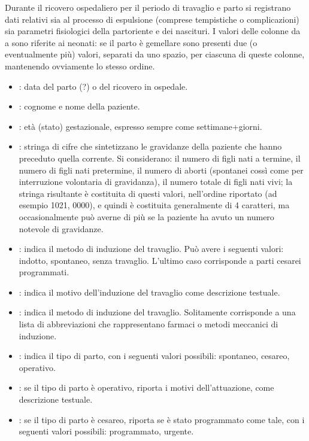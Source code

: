 Durante il ricovero ospedaliero per il periodo di travaglio e parto si registrano dati relativi sia al processo di espulsione (comprese tempistiche o complicazioni) sia parametri fisiologici della partoriente e dei nascituri.
I valori delle colonne da  a  sono riferite ai neonati: se il parto è gemellare sono presenti due (o eventualmente più) valori, separati da uno spazio, per ciascuna di queste colonne, mantenendo ovviamente lo stesso ordine.

\begin{itemize}
\item {}: data del parto (?) o del ricovero in ospedale.
\item {}: cognome e nome della paziente.
\item {}: età (stato) gestazionale, espresso sempre come settimane+giorni.
\item {}: stringa di cifre che sintetizzano le gravidanze della paziente che hanno preceduto quella corrente.
Si considerano: il numero di figli nati a termine, il numero di figli nati pretermine, il numero di aborti (spontanei cossì come per interruzione volontaria di gravidanza), il numero totale di figli nati vivi; la stringa risultante è costituita di questi valori, nell'ordine riportato (ad esempio 1021, 0000), e quindi è costituita generalmente di 4 caratteri, ma occasionalmente può averne di più se la paziente ha avuto un numero notevole di gravidanze.
\item {}: indica il metodo di induzione del travaglio. Può avere i seguenti valori: indotto, spontaneo, senza travaglio. L'ultimo caso corrisponde a parti cesarei programmati.
\item {}: indica il motivo dell'induzione del travaglio come descrizione testuale.
\item {}: indica il metodo di induzione del travaglio. Solitamente corrisponde a una lista di abbreviazioni che rappresentano farmaci o metodi meccanici di induzione.
\item {}: indica il tipo di parto, con i seguenti valori possibili: spontaneo, cesareo, operativo.
\item {}: se il tipo di parto è operativo, riporta i motivi dell'attuazione, come descrizione testuale.
\item {}: se il tipo di parto è cesareo, riporta se è stato programmato come tale, con i seguenti valori possibili: programmato, urgente.

\end{itemize}

